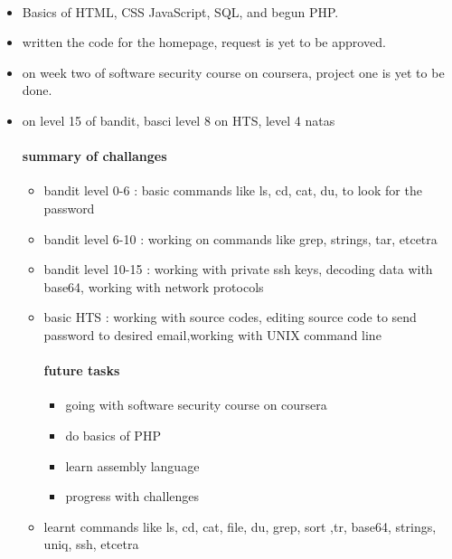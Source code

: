 \documentclass{article}
\begin{document}
\begin{itemize}
\paragraph{}
\begin{itemize}
    \item Basics of HTML, CSS JavaScript, SQL, and begun PHP.
    \item written the code for the homepage, request is yet to be approved.
    \item on week two of software security course on coursera, project one is yet to be done.
    \item on level 15 of bandit, basci level 8 on HTS, level 4 natas
        \paragraph{summary of challanges} 
        \begin{itemize}
            \item bandit level 0-6 : basic commands like ls, cd, cat, du, to look for the password
            \item bandit level 6-10 : working on commands like grep, strings, tar, etcetra
            \item bandit level 10-15 : working with private ssh keys, decoding data with base64, working with network protocols
            \item basic HTS : working with source codes, editing source code to send password to desired email,working with UNIX command line
                \paragraph{future tasks}
                \begin{itemize}
                    \item going with software security course on coursera
                    \item do basics of PHP
                    \item learn assembly language
                    \item progress with challenges
                \end{itemize}
        \end{itemize}
        \begin{itemize}
            \item learnt commands like ls, cd, cat, file, du, grep, sort ,tr, base64, strings, uniq, ssh, etcetra
        \end{itemize}

\end{itemize}
\end{itemize}
\newpage
\end{document}
